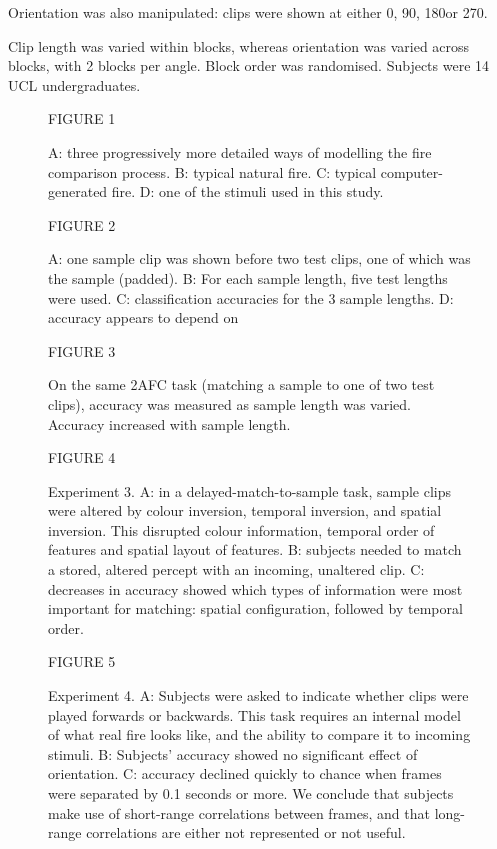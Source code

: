 \documentclass[a4paper]{article}
\begin{document}
Orientation was also manipulated: clips were shown at either 0\degree, 90\degree, 180\degree or 270\degree. 

Clip length was varied within blocks, whereas orientation was varied across blocks, with 2 blocks per angle.  Block order was randomised. Subjects were 14 UCL undergraduates.



  \begin{figure}[!ht]
\centering
  FIGURE 1
    \caption{A: three progressively more detailed ways of modelling the fire comparison process. B: typical natural fire. C: typical computer-generated fire. D: one of the stimuli used in this study.}
    \label{f1}
  \end{figure}

  \begin{figure}[!ht]
\centering
  FIGURE 2
    \caption{A: one sample clip was shown before two test clips, one of which was the sample (padded). B: For each sample length, five test lengths were used. C: classification accuracies for the 3 sample lengths. D: accuracy appears to depend on }
    \label{f2}
  \end{figure}

  \begin{figure}[!ht]
\centering
  FIGURE 3
    \caption{On the same 2AFC task (matching a sample to one of two test clips), accuracy was measured as sample length was varied. Accuracy increased with sample length.}
    \label{f1}
  \end{figure}

  \begin{figure}[!ht]
\centering
  FIGURE 4
    \caption{Experiment 3. A: in a delayed-match-to-sample task, sample clips were altered by colour inversion, temporal inversion, and spatial inversion. This disrupted colour information, temporal order of features and spatial layout of features. B: subjects needed to match a stored, altered percept with an incoming, unaltered clip. C: decreases in accuracy showed which types of information were most important for matching: spatial configuration, followed by temporal order.}
    \label{f4}
  \end{figure}

  \begin{figure}[!ht]
\centering
  FIGURE 5
    \caption{Experiment 4. A: Subjects were asked to indicate whether clips were played forwards or backwards. This task requires an internal model of what real fire looks like, and the ability to compare it to incoming stimuli. B: Subjects' accuracy showed no significant effect of orientation. C: accuracy declined quickly to chance when frames were separated by 0.1 seconds or more. We conclude that subjects make use of short-range correlations between frames, and that long-range correlations are either not represented or not useful.}
    \label{f5}
  \end{figure}


\begin{singlespace}
\begin{footnotesize}
\begin{twocolumn}


\end{twocolumn}
\end{footnotesize}
\end{singlespace}
\newpage
\end{document}
